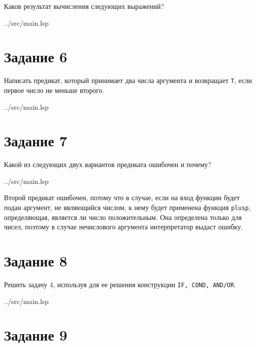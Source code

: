 Каков результат вычисления следующих выражений?

\begin{lstinputlisting}[
	caption={Задание 5},
	label={lst:t5},
	style={lsp},
	linerange={20-25},
	]{../src/main.lsp}
\end{lstinputlisting}

\section*{Задание 6}

Написать предикат, который принимает два числа аргумента и возвращает \texttt{Т}, если первое число не меньше второго.

\begin{lstinputlisting}[
	caption={Задание 6},
	label={lst:t6},
	style={lsp},
	linerange={28-31},
	]{../src/main.lsp}
\end{lstinputlisting}

\section*{Задание 7}

Какой из следующих двух вариантов предиката
ошибочен и почему?

\begin{lstinputlisting}[
	caption={mystery},
	label={lst:func},
	style={lsp},
	linerange={33-37},
	]{../src/main.lsp}
\end{lstinputlisting}

Второй предикат ошибочен, потому что в случае, если на вход функции будет подан аргумент, не являющийся числом, к нему будет применена
функция {\texttt{plusp}}, определяющая, является ли число положительным. Она
определена только для чисел, поэтому в случае нечислового аргумента интерпретатор выдаст ошибку.

\section*{Задание 8}

Решить задачу 4, используя для ее решения конструкции {\texttt{IF, COND, AND/OR}}.

\begin{lstinputlisting}[
	caption={Задание 8},
	label={lst:t8},
	style={lsp},
	linerange={39-53},
	]{../src/main.lsp}
\end{lstinputlisting}

\section*{Задание 9}

